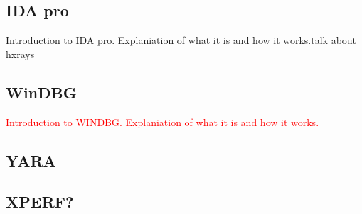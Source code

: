 \subsection{IDA pro}\label{IDA}
Introduction to IDA pro. Explaniation of what it is and how it works.talk about hxrays
\subsection{WinDBG}
\textcolor{red}{Introduction to WINDBG. Explaniation of what it is and how it works.}
\subsection{YARA}
\subsection{XPERF? }

